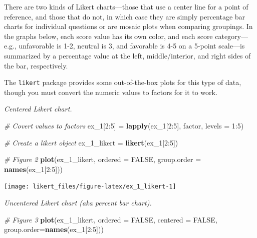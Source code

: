 \documentclass[]{book}
\newenvironment{Shaded}{\begin{snugshade}}{\end{snugshade}}
\newcommand{\KeywordTok}[1]{\textcolor[rgb]{0.13,0.29,0.53}{\textbf{{#1}}}}
\newcommand{\DataTypeTok}[1]{\textcolor[rgb]{0.13,0.29,0.53}{{#1}}}
\newcommand{\DecValTok}[1]{\textcolor[rgb]{0.00,0.00,0.81}{{#1}}}
\newcommand{\StringTok}[1]{\textcolor[rgb]{0.31,0.60,0.02}{{#1}}}
\newcommand{\CommentTok}[1]{\textcolor[rgb]{0.56,0.35,0.01}{\textit{{#1}}}}
\newcommand{\OtherTok}[1]{\textcolor[rgb]{0.56,0.35,0.01}{{#1}}}
\newcommand{\NormalTok}[1]{{#1}}
\begin{document}
There are two kinds of Likert charts---those that use a center line for
a point of reference, and those that do not, in which case they are
simply percentage bar charts for individual questions or are mosaic
plots when comparing groupings. In the graphs below, each score value
has its own color, and each score category---e.g., unfavorable is 1-2,
neutral is 3, and favorable is 4-5 on a 5-point scale---is summarized by
a percentage value at the left, middle/interior, and right sides of the
bar, respectively.

The \texttt{likert} package provides some out-of-the-box plots for this
type of data, though you must convert the numeric values to factors for
it to work.

\emph{Centered Likert chart.}

\begin{Shaded}
\begin{Highlighting}[]
\CommentTok{# Covert values to factors}
\NormalTok{ex_1[}\DecValTok{2}\NormalTok{:}\DecValTok{5}\NormalTok{] =}\StringTok{ }\KeywordTok{lapply}\NormalTok{(ex_1[}\DecValTok{2}\NormalTok{:}\DecValTok{5}\NormalTok{], factor, }\DataTypeTok{levels =} \DecValTok{1}\NormalTok{:}\DecValTok{5}\NormalTok{)}

\CommentTok{# Create a likert object}
\NormalTok{ex_1_likert =}\StringTok{ }\KeywordTok{likert}\NormalTok{(ex_1[}\DecValTok{2}\NormalTok{:}\DecValTok{5}\NormalTok{])}

\CommentTok{# Figure 2}
\KeywordTok{plot}\NormalTok{(ex_1_likert, }\DataTypeTok{ordered =} \OtherTok{FALSE}\NormalTok{, }\DataTypeTok{group.order =} \KeywordTok{names}\NormalTok{(ex_1[}\DecValTok{2}\NormalTok{:}\DecValTok{5}\NormalTok{]))}
\end{Highlighting}
\end{Shaded}

\begin{center}\texttt{[image: likert\_files/figure-latex/ex\_1\_likert-1]} \end{center}

\emph{Uncentered Likert chart (aka percent bar chart).}

\begin{Shaded}
\begin{Highlighting}[]
\CommentTok{# Figure 3}
\KeywordTok{plot}\NormalTok{(ex_1_likert, }\DataTypeTok{ordered =} \OtherTok{FALSE}\NormalTok{, }\DataTypeTok{centered =} \OtherTok{FALSE}\NormalTok{, }\DataTypeTok{group.order=}\KeywordTok{names}\NormalTok{(ex_1[}\DecValTok{2}\NormalTok{:}\DecValTok{5}\NormalTok{]))}
\end{Highlighting}
\end{Shaded}
\end{document}
